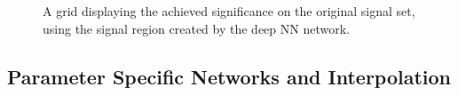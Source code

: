 \begin{figure}
    \caption{A grid displaying the achieved significance on the original signal set, using the signal region 
    created by the deep \ac{NN} network.}
    \label{fig:NNGridSig}
\end{figure}
\subsection{Parameter Specific Networks and Interpolation}